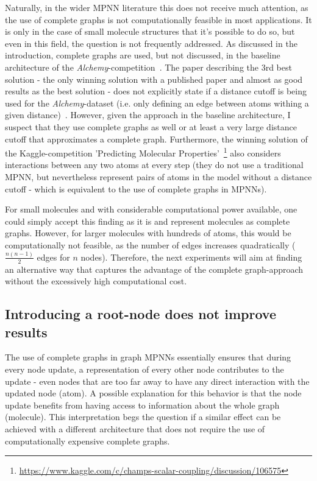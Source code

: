 Naturally, in the wider MPNN literature this does not receive much attention, as the use of complete graphs is not computationally feasible in most applications. It is only in the case of small molecule structures that it's possible to do so, but even in this field, the question is not frequently addressed. As discussed in the introduction, complete graphs are used, but not discussed, in the baseline architecture of the \textit{Alchemy}-competition~\cite{Chen2019}. The paper describing the 3rd best solution - the only winning solution with a published paper and almost as good results as the best solution - does not explicitly state if a distance cutoff is being used for the \textit{Alchemy}-dataset (i.e. only defining an edge between atoms withing a given distance)~\cite{Klicpera2019}. However, given the approach in the baseline architecture, I suspect that they use complete graphs as well or at least a very large distance cutoff that approximates a complete graph. Furthermore, the winning solution of the Kaggle-competition 'Predicting Molecular Properties'~\footnote{\url{https://www.kaggle.com/c/champs-scalar-coupling/discussion/106575}} also considers interactions between any two atoms at every step (they do not use a traditional MPNN, but nevertheless represent pairs of atoms in the model without a distance cutoff - which is equivalent to the use of complete graphs in MPNNs).

For small molecules and with considerable computational power available, one could simply accept this finding as it is and represent molecules as complete graphs. However, for larger molecules with hundreds of atoms, this would be computationally not feasible, as the number of edges increases quadratically ($\frac{n(n - 1)}{2}$ edges for $n$ nodes). Therefore, the next experiments will aim at finding an alternative way that captures the advantage of the complete graph-approach without the excessively high computational cost.





\subsection{Introducing a root-node does not improve results}
\label{sec:root-node}


The use of complete graphs in graph MPNNs essentially ensures that during every node update, a representation of every other node contributes to the update - even nodes that are too far away to have any direct interaction with the updated node (atom).
A possible explanation for this behavior is that the node update benefits from having access to information about the whole graph (molecule). This interpretation begs the question if a similar effect can be achieved with a different architecture that does not require the use of computationally expensive complete graphs.

